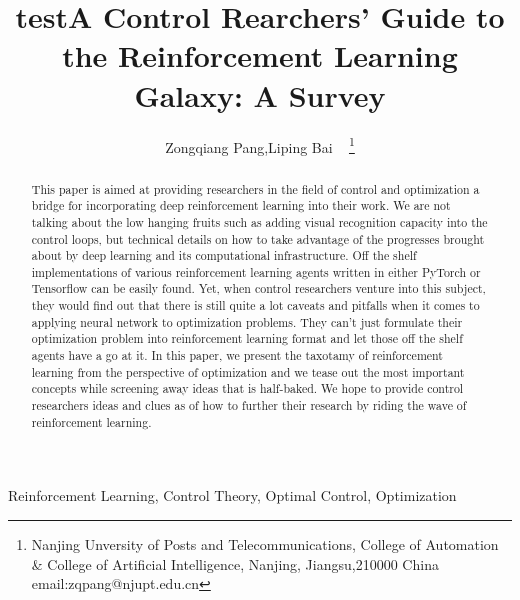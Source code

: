 \documentclass[journal]{IEEEtran}
\begin{document}
    \title{test}
\title{A Control Rearchers' Guide to the Reinforcement Learning Galaxy: A Survey}
\author{ Zongqiang Pang,Liping Bai ~ \thanks{Nanjing Unversity of Posts and Telecommunications, College of Automation \& College of Artificial Intelligence, Nanjing, Jiangsu,210000 China email:zqpang@njupt.edu.cn}}
\maketitle
\begin{abstract}
This paper is aimed at providing researchers in the field of control and optimization a bridge for incorporating deep reinforcement learning into their work. We are not talking about the low hanging fruits such as adding visual recognition capacity into the control loops, but technical details on how to take advantage of the progresses brought about by deep learning and its computational infrastructure. Off the shelf implementations of various reinforcement learning agents written in either PyTorch or Tensorflow can be easily found. Yet, when control researchers venture into this subject, they would find out that there is still quite a lot caveats and pitfalls when it comes to applying neural network to optimization problems. They can't just formulate their optimization problem into reinforcement learning format and let those off the shelf agents have a go at it. In this paper, we present the taxotamy of reinforcement learning from the perspective of optimization and we tease out the most important concepts while screening away ideas that is half-baked. We hope to provide control researchers ideas and clues as of how to further their research by riding the wave of reinforcement learning.

\end{abstract}
\begin{IEEEkeywords}
Reinforcement Learning, Control Theory, Optimal Control, Optimization
\end{IEEEkeywords}
%
\IEEEpeerreviewmaketitle
\end{document}
